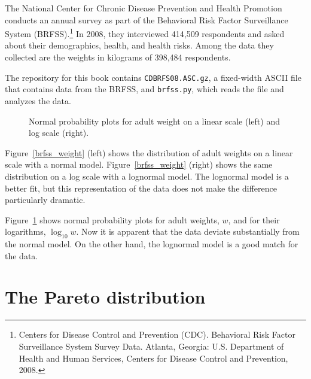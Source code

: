The National Center for Chronic Disease
Prevention and Health Promotion conducts an annual survey as part of
the Behavioral Risk Factor Surveillance System
(BRFSS).\footnote{Centers for Disease Control and Prevention
  (CDC). Behavioral Risk Factor Surveillance System Survey
  Data. Atlanta, Georgia: U.S. Department of Health and Human
  Services, Centers for Disease Control and Prevention, 2008.}  In
2008, they interviewed 414,509 respondents and asked about their
demographics, health, and health risks.
Among the data they collected are the weights in kilograms of
398,484 respondents.

The repository for this book contains {\tt CDBRFS08.ASC.gz},
a fixed-width ASCII file that contains data from the BRFSS,
and {\tt brfss.py}, which reads the file and analyzes the data.

\begin{figure}
\caption{Normal probability plots for adult weight on a linear scale
  (left) and log scale (right).}
\label{brfss_weight_normal}
\end{figure}

Figure~\ref{brfss_weight} (left) shows the distribution of adult
weights on a linear scale with a normal model.
Figure~\ref{brfss_weight} (right) shows the same distribution on a log
scale with a lognormal model.  The lognormal model is a better fit,
but this representation of the data does not make the difference
particularly dramatic.   

Figure~\ref{brfss_weight_normal} shows normal probability plots for
adult weights, $w$, and for their logarithms, $\log_{10} w$.  Now it
is apparent that the data deviate substantially from the normal model.
On the other hand, the lognormal model is a good match for the data.
 
 
 
  
 


\section{The Pareto distribution}

